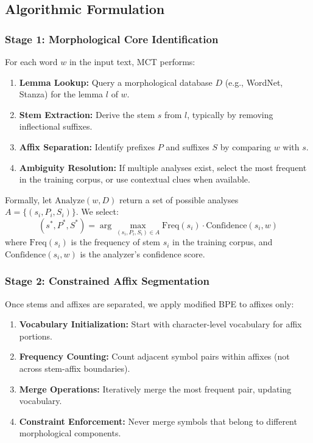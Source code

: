\documentclass[conference]{IEEEtran}
\begin{document}
\subsection{Algorithmic Formulation}

\subsubsection{Stage 1: Morphological Core Identification}
For each word $w$ in the input text, MCT performs:
\begin{enumerate}
    \item \textbf{Lemma Lookup:} Query a morphological database $D$ (e.g., WordNet, Stanza) for the lemma $l$ of $w$.
    \item \textbf{Stem Extraction:} Derive the stem $s$ from $l$, typically by removing inflectional suffixes.
    \item \textbf{Affix Separation:} Identify prefixes $P$ and suffixes $S$ by comparing $w$ with $s$.
    \item \textbf{Ambiguity Resolution:} If multiple analyses exist, select the most frequent in the training corpus, or use contextual clues when available.
\end{enumerate}

Formally, let $\text{Analyze}(w, D)$ return a set of possible analyses $A = \{(s_i, P_i, S_i)\}$. We select:
\[
(s^*, P^*, S^*) = \arg\max_{(s_i, P_i, S_i) \in A} \text{Freq}(s_i) \cdot \text{Confidence}(s_i, w)
\]
where $\text{Freq}(s_i)$ is the frequency of stem $s_i$ in the training corpus, and $\text{Confidence}(s_i, w)$ is the analyzer's confidence score.

\subsubsection{Stage 2: Constrained Affix Segmentation}
Once stems and affixes are separated, we apply modified BPE to affixes only:
\begin{enumerate}
    \item \textbf{Vocabulary Initialization:} Start with character-level vocabulary for affix portions.
    \item \textbf{Frequency Counting:} Count adjacent symbol pairs within affixes (not across stem-affix boundaries).
    \item \textbf{Merge Operations:} Iteratively merge the most frequent pair, updating vocabulary.
    \item \textbf{Constraint Enforcement:} Never merge symbols that belong to different morphological components.
\end{enumerate}
\end{document}
